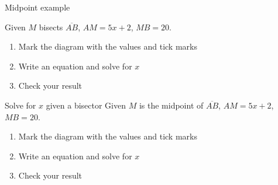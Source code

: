 \begin{frame}{Midpoint example}
  \begin{block}{Given $M$ bisects $\overline{AB}$, $AM=5x+2$, $MB=20$.}
    \begin{enumerate}
      \item Mark the diagram with the values and tick marks
      \item Write an equation and solve for $x$
      \item Check your result
    \end{enumerate} \vspace{1cm}
      \begin{center}
      \end{center}
  \end{block}
\end{frame}

\begin{frame}{Solve for $x$ given a bisector}
  Given $M$ is the midpoint of $\overline{AB}$, $AM=5x+2$, $MB=20$.
  \begin{enumerate}
    \item Mark the diagram with the values and tick marks
    \item Write an equation and solve for $x$
    \item Check your result
  \end{enumerate} \vspace{1cm}
    \begin{center}
    \end{center} \vspace{4cm}
  \end{frame}
  
